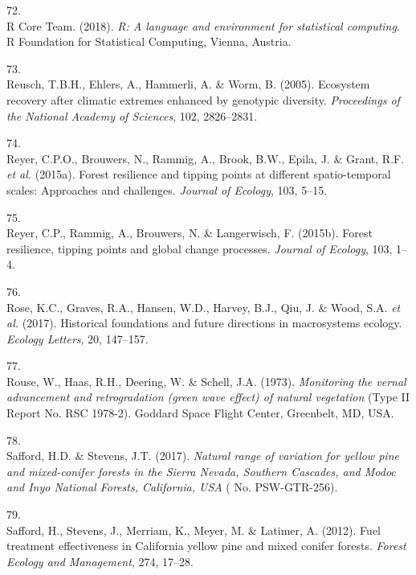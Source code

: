 \documentclass[]{article}
\begin{document}
\leavevmode\hypertarget{ref-rcoreteam2018}{}%
72.\\
R Core Team. (2018). \emph{R: A language and environment for statistical
computing}. R Foundation for Statistical Computing, Vienna, Austria.

\leavevmode\hypertarget{ref-reusch2005}{}%
73.\\
Reusch, T.B.H., Ehlers, A., Hammerli, A. \& Worm, B. (2005). Ecosystem
recovery after climatic extremes enhanced by genotypic diversity.
\emph{Proceedings of the National Academy of Sciences}, 102, 2826--2831.

\leavevmode\hypertarget{ref-reyer2015a}{}%
74.\\
Reyer, C.P.O., Brouwers, N., Rammig, A., Brook, B.W., Epila, J. \&
Grant, R.F. \emph{et al.} (2015a). Forest resilience and tipping points
at different spatio-temporal scales: Approaches and challenges.
\emph{Journal of Ecology}, 103, 5--15.

\leavevmode\hypertarget{ref-reyer2015}{}%
75.\\
Reyer, C.P., Rammig, A., Brouwers, N. \& Langerwisch, F. (2015b). Forest
resilience, tipping points and global change processes. \emph{Journal of
Ecology}, 103, 1--4.

\leavevmode\hypertarget{ref-rose2017}{}%
76.\\
Rose, K.C., Graves, R.A., Hansen, W.D., Harvey, B.J., Qiu, J. \& Wood,
S.A. \emph{et al.} (2017). Historical foundations and future directions
in macrosystems ecology. \emph{Ecology Letters}, 20, 147--157.

\leavevmode\hypertarget{ref-rouse1973}{}%
77.\\
Rouse, W., Haas, R.H., Deering, W. \& Schell, J.A. (1973).
\emph{Monitoring the vernal advancement and retrogradation (green wave
effect) of natural vegetation} (Type II Report No. RSC 1978-2). Goddard
Space Flight Center, Greenbelt, MD, USA.

\leavevmode\hypertarget{ref-safford2017}{}%
78.\\
Safford, H.D. \& Stevens, J.T. (2017). \emph{Natural range of variation
for yellow pine and mixed-conifer forests in the Sierra Nevada, Southern
Cascades, and Modoc and Inyo National Forests, California, USA} ( No.
PSW-GTR-256).

\leavevmode\hypertarget{ref-safford2012}{}%
79.\\
Safford, H., Stevens, J., Merriam, K., Meyer, M. \& Latimer, A. (2012).
Fuel treatment effectiveness in California yellow pine and mixed conifer
forests. \emph{Forest Ecology and Management}, 274, 17--28.
\end{document}
